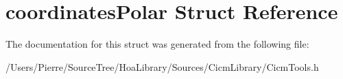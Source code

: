 \hypertarget{structcoordinates_polar}{\section{coordinates\-Polar Struct Reference}
\label{structcoordinates_polar}
}


The documentation for this struct was generated from the following file\-:\begin{DoxyCompactItemize}
\item 
/\-Users/\-Pierre/\-Source\-Tree/\-Hoa\-Library/\-Sources/\-Cicm\-Library/Cicm\-Tools.\-h\end{DoxyCompactItemize}

